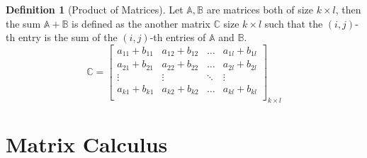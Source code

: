 \documentclass[
]{book}
\theoremstyle{definition}
\newtheorem{definition}{Definition}[chapter]
\theoremstyle{definition}
\theoremstyle{definition}
\theoremstyle{definition}
\theoremstyle{remark}
\begin{document}
\begin{definition}[Product of Matrices]
\protect\hypertarget{def:matprod}{}\label{def:matprod}Let \(\mathbb{A},\mathbb{B}\) are matrices both of size \(k\times l\), then the sum \(\mathbb{A}+\mathbb{B}\) is defined as the another matrix \(\mathbb{C}\) size \(k\times l\) such that the \((i,j)\)-th entry is the sum of the \((i,j)\)-th entries of \(\mathbb A\) and \(\mathbb B\).
\[
  \mathbb{C}=\begin{bmatrix}
  a_{11}+b_{11} & a_{12}+b_{12} & \ldots & a_{1l}+b_{1l} \\
  a_{21}+b_{21} & a_{22}+b_{22} & \ldots & a_{2l}+b_{2l} \\
  \vdots & \vdots & \ddots & \vdots \\
  a_{k1}+b_{k1} & a_{k2}+b_{k2} & \ldots & a_{kl}+b_{kl} \\
  \end{bmatrix}_{k\times l}
  \]
\end{definition}

\hypertarget{matrix-calculus}{%
\chapter{Matrix Calculus}\label{matrix-calculus}}

  
\end{document}
